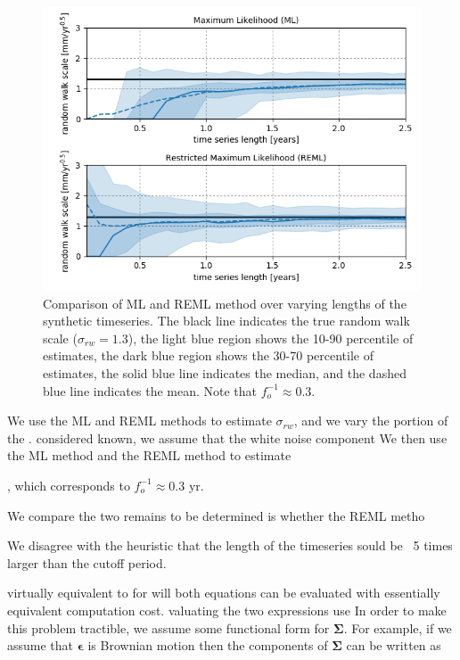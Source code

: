 \documentclass[10pt,a4paper]{article}
\begin{document}
\begin{figure}
\includegraphics[scale=1.0]{figure_1.png}
\caption{Comparison of ML and REML method over varying lengths of the synthetic timeseries. The black line indicates the true random walk scale ($\sigma_{rw}=1.3$), the light blue region shows the 10-90 percentile of estimates, the dark blue region shows the 30-70 percentile of estimates, the solid blue line indicates the median, and the dashed blue line indicates the mean. Note that $f_o^{-1} \approx 0.3$.}   
\label{fig:EstimateRW}
\end{figure}



We use the ML and REML methods to estimate $\sigma_{rw}$, and we vary the portion of the .    
considered known, we assume that the white noise component We then use the ML method and the REML method to estimate   

  

, which corresponds to $f_o^{-1} \approx 0.3$ yr.

We compare the two  remains to be determined is whether the REML metho


We disagree with the heuristic that the length of the timeseries sould be ~5 times larger than the cutoff period.

virtually equivalent to for will both equations can be evaluated with essentially equivalent computation cost. valuating the two expressions use 
In order to make this problem tractible, we assume some functional form for $\mathbf{\Sigma}$. For example, if we assume that $\mathbf{\epsilon}$ is Brownian motion then the components of $\mathbf{\Sigma}$ can be written as
\end{document}
